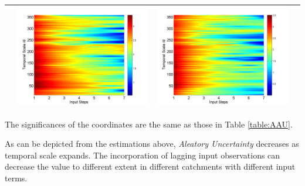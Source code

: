\documentclass[draft,wrr]{AGUTeX}
\begin{document}
\begin{article}
\begin{table}[H]
\begin{tabular}{cccc}
&\begin{minipage}{.3\textwidth}\includegraphics[width=\linewidth]{resultgraph/06810000pep_rela.png}\end{minipage}
&\begin{minipage}{.3\textwidth}\includegraphics[width=\linewidth]{resultgraph/06810000pepq_rela.png}\end{minipage}
\\
\hline
\end{tabular}
\end{table}
The significances of the coordinates are the same as those in Table \ref{table:AAU}.

As can be depicted from the estimations above, \emph{Aleatory Uncertainty} decreases  as temporal scale expands. The incorporation of lagging input observations can decrease the value to different extent in different catchments with different input terms. 


\end{article}
\end{document}
